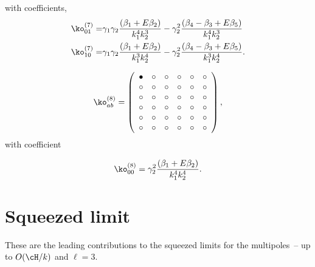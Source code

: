 {with coefficients, 
\begin{align*}
\ko_{01}^{(7)}=& \gamma_1 \gamma_2 \frac{\left( \beta_1 + E \beta_2 \right)}{k_1^4 k_2^3} - \gamma_2^2 \frac{\left( {\beta_{4}-\beta_{3}} + E \beta_{5}\right) }{k_1^4 k_2^3} \\
\ko_{10}^{(7)}=& \gamma_1 \gamma_2 \frac{\left( \beta_1 + E \beta_2 \right)}{k_1^3 k_2^4} - \gamma_2^2 \frac{\left( {\beta_{4}-\beta_{3}} + E \beta_{5} \right)}{k_1^3 k_2^4} .
\end{align*}


\begin{equation}
	\ko^{(8)}_{ab}= 
 \left( \begin {array}{cccccc} \bullet &\circ &\circ &\circ &
\circ &\circ \\  \circ &\circ &\circ &
\circ &\circ &\circ \\  \circ &\circ &
\circ &\circ &\circ &\circ \\  \circ &
\circ &\circ &\circ &\circ &\circ \\  
\circ &\circ &\circ &\circ &\circ &\circ 
\\  \circ &\circ &\circ &\circ &\circ &
\circ \end {array} \right) , 
\end{equation}
with coefficient

\begin{equation*}
	\ko_{00}^{(8)}= \gamma_2^2 \frac{\left( \beta_1 + E \beta_2 \right)}{k_1^4 k_2^4}.
\end{equation*}


%
\section{Squeezed limit}

These are the leading contributions to the squeezed limits for the multipoles~-- up to $O(\cH/k)$ and \(\ell = 3\).



}
